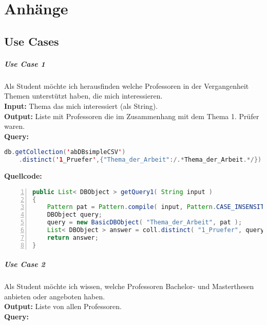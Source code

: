 \chapter{Anhänge}
\section{Use Cases}\label{use_cases}

\paragraph{Use Case 1} Als Student möchte ich herausfinden welche Professoren in der Vergangenheit Themen unterstützt haben, die mich interessieren. \\
\textbf{Input:} Thema das mich interessiert (als String). \\
\textbf{Output:} Liste mit Professoren die im Zusammenhang mit dem Thema 1. Prüfer waren. \\
\textbf{Query:}

\begin{lstlisting}[caption={Query zu Use Case 1},language=java,captionpos=t,numbers=none, numberstyle=\tiny,basicstyle=\scriptsize,breaklines=true]
db.getCollection('abDBsimpleCSV')
	.distinct('1_Pruefer',{"Thema_der_Arbeit":/.*Thema_der_Arbeit.*/})
\end{lstlisting}\label{lst:query1}

\textbf{Quellcode:}

\begin{lstlisting}[caption={Quellcode zu Use Case 1},language=java,captionpos=t,numbers=left, numberstyle=\tiny,basicstyle=\scriptsize,breaklines=true]
public List< DBObject > getQuery1( String input )
{
    Pattern pat = Pattern.compile( input, Pattern.CASE_INSENSITIVE );
    DBObject query;
    query = new BasicDBObject( "Thema_der_Arbeit", pat );
    List< DBObject > answer = coll.distinct( "1_Pruefer", query );
    return answer;
}
\end{lstlisting}\label{lst:query1code}

\paragraph{Use Case 2} Als Student möchte ich wissen, welche Professoren Bachelor- und Masterthesen anbieten oder angeboten haben. \\
\textbf{Output:} Liste von allen Professoren. \\
\textbf{Query:}

